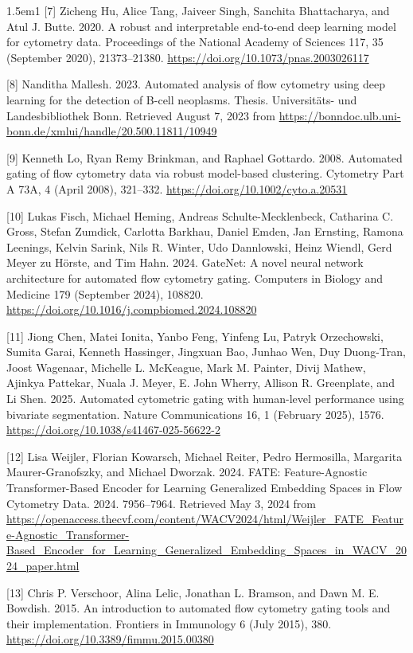 \documentclass[ASNA]{latex/wiley/USG}
\begin{document}
\begin{hangparas}{1.5em}{1}
{[}7{]} Zicheng Hu, Alice Tang, Jaiveer Singh, Sanchita Bhattacharya,
and Atul J. Butte. 2020. A robust and interpretable end-to-end deep
learning model for cytometry data. Proceedings of the National Academy
of Sciences 117, 35 (September 2020), 21373--21380.
\url{https://doi.org/10.1073/pnas.2003026117}

{[}8{]} Nanditha Mallesh. 2023. Automated analysis of flow cytometry
using deep learning for the detection of B-cell neoplasms. Thesis.
Universitäts- und Landesbibliothek Bonn. Retrieved August 7, 2023 from
\url{https://bonndoc.ulb.uni-bonn.de/xmlui/handle/20.500.11811/10949}

{[}9{]} Kenneth Lo, Ryan Remy Brinkman, and Raphael Gottardo. 2008.
Automated gating of flow cytometry data via robust model-based
clustering. Cytometry Part A 73A, 4 (April 2008), 321--332.
\url{https://doi.org/10.1002/cyto.a.20531}

{[}10{]} Lukas Fisch, Michael Heming, Andreas Schulte-Mecklenbeck,
Catharina C. Gross, Stefan Zumdick, Carlotta Barkhau, Daniel Emden, Jan
Ernsting, Ramona Leenings, Kelvin Sarink, Nils R. Winter, Udo
Dannlowski, Heinz Wiendl, Gerd Meyer zu Hörste, and Tim Hahn. 2024.
GateNet: A novel neural network architecture for automated flow
cytometry gating. Computers in Biology and Medicine 179 (September
2024), 108820. \url{https://doi.org/10.1016/j.compbiomed.2024.108820}

{[}11{]} Jiong Chen, Matei Ionita, Yanbo Feng, Yinfeng Lu, Patryk
Orzechowski, Sumita Garai, Kenneth Hassinger, Jingxuan Bao, Junhao Wen,
Duy Duong-Tran, Joost Wagenaar, Michelle L. McKeague, Mark M. Painter,
Divij Mathew, Ajinkya Pattekar, Nuala J. Meyer, E. John Wherry, Allison
R. Greenplate, and Li Shen. 2025. Automated cytometric gating with
human-level performance using bivariate segmentation. Nature
Communications 16, 1 (February 2025), 1576.
\url{https://doi.org/10.1038/s41467-025-56622-2}

{[}12{]} Lisa Weijler, Florian Kowarsch, Michael Reiter, Pedro
Hermosilla, Margarita Maurer-Granofszky, and Michael Dworzak. 2024.
FATE: Feature-Agnostic Transformer-Based Encoder for Learning
Generalized Embedding Spaces in Flow Cytometry Data. 2024. 7956--7964.
Retrieved May 3, 2024 from
\url{https://openaccess.thecvf.com/content/WACV2024/html/Weijler_FATE_Feature-Agnostic_Transformer-Based_Encoder_for_Learning_Generalized_Embedding_Spaces_in_WACV_2024_paper.html}

{[}13{]} Chris P. Verschoor, Alina Lelic, Jonathan L. Bramson, and Dawn
M. E. Bowdish. 2015. An introduction to automated flow cytometry gating
tools and their implementation. Frontiers in Immunology 6 (July 2015),
380. \url{https://doi.org/10.3389/fimmu.2015.00380}


\end{hangparas}
\end{document}
